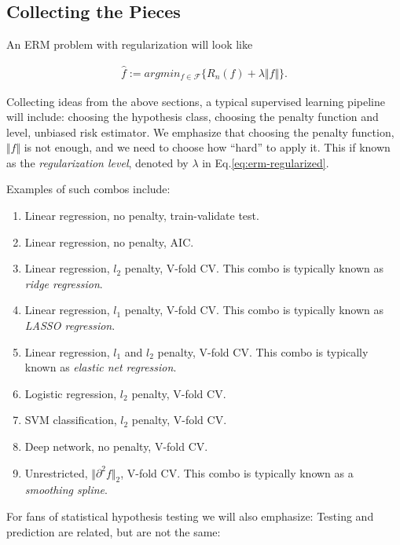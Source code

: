 \documentclass[]{book}
\providecommand{\tightlist}{%
  \setlength{\itemsep}{0pt}\setlength{\parskip}{0pt}}
\theoremstyle{definition}
\theoremstyle{definition}
\theoremstyle{definition}
\theoremstyle{remark}
\begin{document}
\subsection{Collecting the Pieces}\label{collecting-the-pieces}

An ERM problem with regularization will look like

\begin{align}
  \hat f := argmin_{f \in \mathcal{F}} \{ R_n(f)  + \lambda \Vert f \Vert \}.
  \label{eq:erm-regularized}  
\end{align}

Collecting ideas from the above sections, a typical supervised learning
pipeline will include: choosing the hypothesis class, choosing the
penalty function and level, unbiased risk estimator. We emphasize that
choosing the penalty function, \(\Vert f \Vert\) is not enough, and we
need to choose how ``hard'' to apply it. This if known as the
\emph{regularization level}, denoted by \(\lambda\) in
Eq.\eqref{eq:erm-regularized}.

Examples of such combos include:

\begin{enumerate}
\def\labelenumi{\arabic{enumi}.}
\tightlist
\item
  Linear regression, no penalty, train-validate test.
\item
  Linear regression, no penalty, AIC.
\item
  Linear regression, \(l_2\) penalty, V-fold CV. This combo is typically
  known as \emph{ridge regression}.
\item
  Linear regression, \(l_1\) penalty, V-fold CV. This combo is typically
  known as \emph{LASSO regression}.
\item
  Linear regression, \(l_1\) and \(l_2\) penalty, V-fold CV. This combo
  is typically known as \emph{elastic net regression}.
\item
  Logistic regression, \(l_2\) penalty, V-fold CV.
\item
  SVM classification, \(l_2\) penalty, V-fold CV.
\item
  Deep network, no penalty, V-fold CV.
\item
  Unrestricted, \(\Vert \partial^2 f \Vert_2\), V-fold CV. This combo is
  typically known as a \emph{smoothing spline}.
\end{enumerate}

For fans of statistical hypothesis testing we will also emphasize:
Testing and prediction are related, but are not the same:
\end{document}
